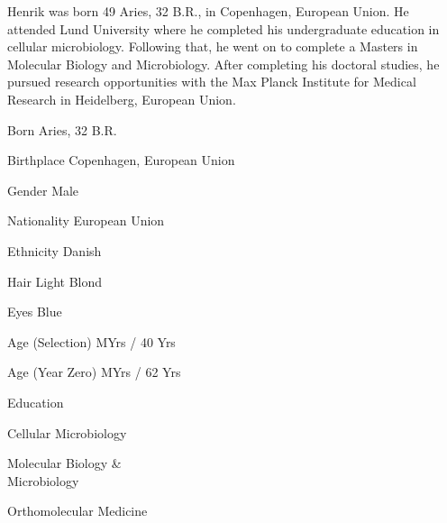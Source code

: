 
Henrik was born 49 Aries, 32 B.R., in Copenhagen, European Union. He attended Lund University where he completed his undergraduate education in cellular microbiology. Following that, he went on to complete a Masters in Molecular Biology and Microbiology. After completing his doctoral studies, he pursued research opportunities with the Max Planck Institute for Medical Research in Heidelberg, European Union. 
{
    \SetupCharacterTable

    \bTABLEbody
        \bTR
            \bTC Born \eTC
             Aries, 32 B.R. \eTC
        \eTR

        \bTR
            \bTC Birthplace \eTC
            \bTC Copenhagen, European Union \eTC
        \eTR
        
        \bTR
            \bTC Gender \eTC
            \bTC Male \eTC
        \eTR
            
        \bTR
            \bTC Nationality \eTC
            \bTC European Union \eTC
        \eTR
        
        \bTR
            \bTC Ethnicity \eTC
            \bTC Danish \eTC
        \eTR
        
        \bTR
          \bTC Hair \eTC
          \bTC Light Blond \eTC
        \eTR
        
        \bTR
            \bTC Eyes \eTC
            \bTC Blue \eTC
        \eTR

        \bTR
            \bTC Age (Selection) \eTC
             MYrs / 40 Yrs \eTC
        \eTR

        \bTR
            \bTC Age (Year Zero) \eTC
             MYrs / 62 Yrs \eTC
        \eTR

        \bTR
            \bTC Education \eTC
            \bTC 
                \startitemize[4]
                \startpacked
                \item Cellular Microbiology
                \item Molecular Biology &\\Microbiology
                \item Orthomolecular Medicine
                \stoppacked
                \stopitemize
            \eTC
        \eTR
        
}
